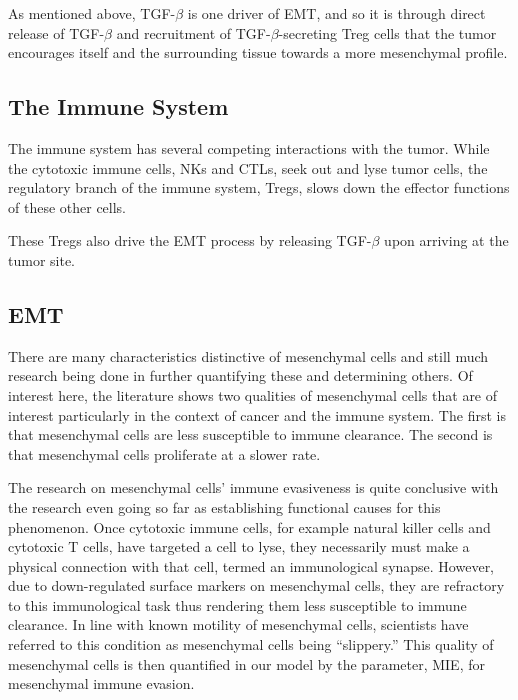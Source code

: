 \documentclass{article}
\begin{document}
As mentioned above, TGF-$\beta$ is one driver of EMT, and so it is through direct release of TGF-$\beta$ and recruitment of TGF-$\beta$-secreting Treg cells that the tumor encourages itself and the surrounding tissue towards a more mesenchymal profile. 

\subsection{The Immune System}\label{TheImmuneSystem}
The immune system has several competing interactions with the tumor.
While the cytotoxic immune cells, NKs and CTLs, seek out and lyse tumor cells, the regulatory branch of the immune system, Tregs, slows down the effector functions of these other cells.

These Tregs also drive the EMT process by releasing TGF-$\beta$ upon arriving at the tumor site.

\subsection{EMT}\label{EMT}
There are many characteristics distinctive of mesenchymal cells and still much research being done in further quantifying these and determining others.
Of interest here, the literature shows two qualities of mesenchymal cells that are of interest particularly in the context of cancer and the immune system.
The first is that mesenchymal cells are less susceptible to immune clearance.
The second is that mesenchymal cells proliferate at a slower rate.

The research on mesenchymal cells' immune evasiveness is quite conclusive with the research even going so far as establishing functional causes for this phenomenon.
Once cytotoxic immune cells, for example natural killer cells and cytotoxic T cells, have targeted a cell to lyse, they necessarily must make a physical connection with that cell, termed an immunological synapse.
However, due to down-regulated surface markers on mesenchymal cells, they are refractory to this immunological task thus rendering them less susceptible to immune clearance.
In line with known motility of mesenchymal cells, scientists have referred to this condition as mesenchymal cells being ``slippery.''
This quality of mesenchymal cells is then quantified in our model by the parameter, MIE, for mesenchymal immune evasion.
\end{document}
